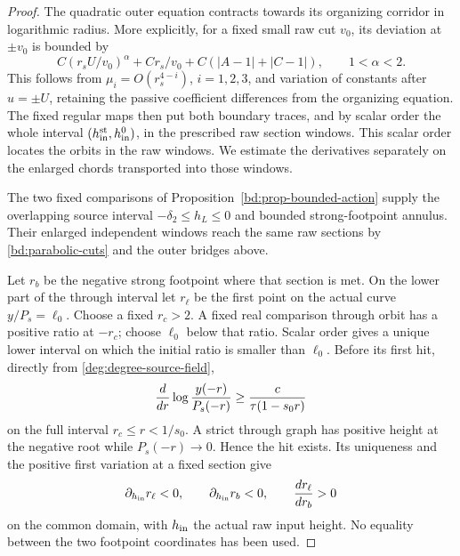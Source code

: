 \begin{proof}
The quadratic outer equation contracts towards its organizing corridor
in logarithmic radius.  More explicitly, for a fixed small raw cut
\(v_0\), its deviation at \(\pm v_0\) is bounded by
\[
 C(r_sU/v_0)^\alpha+Cr_s/v_0
       +C(|A-1|+|C-1|),\qquad 1<\alpha<2.
\]
This follows from \(\mu_i=O(r_s^{4-i})\), \(i=1,2,3\), and
variation of constants after \(u=\pm U\), retaining the passive
coefficient differences from the organizing equation. The fixed regular maps
then put both boundary traces, and by scalar order the whole interval
\((h_{\rm in}^{\rm st},h_{\rm in}^0)\), in the prescribed raw section
windows.
This scalar order locates the orbits in the raw windows. We estimate
the derivatives separately on the enlarged chords transported into
those windows.

The two fixed comparisons of Proposition~\ref{bd:prop-bounded-action}
supply the overlapping source interval $-\delta_2\le h_L\le0$ and
bounded strong-footpoint annulus. Their enlarged independent windows
reach the same raw sections by \eqref{bd:parabolic-cuts} and the outer
bridges above.

Let \(r_b\) be the negative strong footpoint where that section is
met.  On the lower part of the through interval let \(r_\ell\) be
the first point on the actual curve \(y/P_s=\ell_0\).
Choose a fixed \(r_c>2\).  A fixed real comparison through orbit
has a positive ratio at \(-r_c\); choose \(\ell_0\) below that
ratio.  Scalar order gives a unique lower interval on which the
initial ratio is smaller than \(\ell_0\).  Before its first hit,
directly from \eqref{deg:degree-source-field},
\begin{equation}
 {d\over dr}\log{y(-r)\over P_s(-r)}
 \ge {c\over\tau(1-s_0r)}
 \label{deg:degree-ratio-monotonicity}
\end{equation}
on the full interval \(r_c\le r<1/s_0\).  A strict through graph
has positive height at the negative root while \(P_s(-r)\to0\).
Hence the hit exists.  Its uniqueness and the positive first
variation at a fixed section give
\begin{equation}\label{deg:degree-phase-order}
 \partial_{h_{\rm in}}r_\ell<0,\qquad
 \partial_{h_{\rm in}}r_b<0,\qquad
 \frac{dr_\ell}{dr_b}>0
\end{equation}
on the common domain, with \(h_{\rm in}\) the actual raw input height.
No equality between the two footpoint coordinates has been used.


\end{proof}
